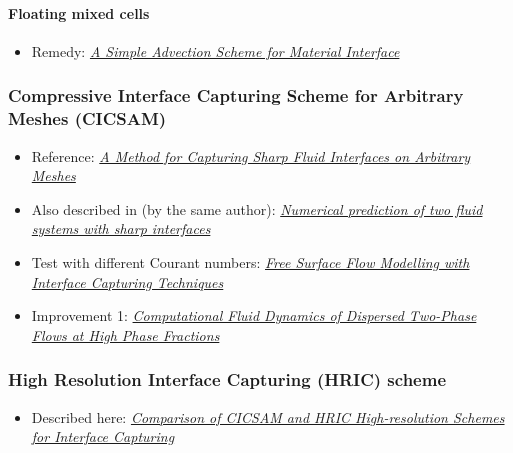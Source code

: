 \paragraph{Floating mixed cells}

\begin{itemize}
    \item Remedy: \textit{\href{https://e-reports-ext.llnl.gov/pdf/245038.pdf}{A Simple Advection Scheme for Material Interface}}
\end{itemize}

\subsubsection{Compressive Interface Capturing Scheme for Arbitrary Meshes (CICSAM)}

\begin{itemize}
    \item Reference: \textit{\href{http://ac.els-cdn.com/S0021999199962769/1-s2.0-S0021999199962769-main.pdf?_tid=85161b57da5f4401e55c9d07495e24ea&acdnat=1336167249_a59e4f578adbacf3bff69936c48cdd57}{A Method for Capturing Sharp Fluid Interfaces on Arbitrary Meshes}}
    \item Also described in (by the same author): \textit{\href{http://powerlab.fsb.hr/ped/kturbo/OpenFOAM/docs/OnnoUbbinkPhD.pdf}{Numerical prediction of two fluid systems with sharp interfaces}}
    \item Test with different Courant numbers: \textit{\href{http://www.marin.nl/upload_mm/8/2/c/1807524470_1999999096_2007-ECCOMAS_HoekstraVazAbeilBunnik.pdf}{Free Surface Flow Modelling with Interface Capturing Techniques}}
    \item Improvement 1: \textit{\href{http://powerlab.fsb.hr/ped/kturbo/openfoam/docs/HenrikRuschePhD2002.pdf}{Computational Fluid Dynamics of Dispersed Two-Phase Flows at High Phase Fractions}}
\end{itemize}

\subsubsection{High Resolution Interface Capturing (HRIC) scheme}

\begin{itemize}
    \item Described here: \textit{\href{http://warminski.pollub.plwww.ptmts.org.pl/Waclaw-Koron-2-08.pdf}{Comparison of CICSAM and HRIC High-resolution Sche\-mes for Interface Capturing}}
\end{itemize}

